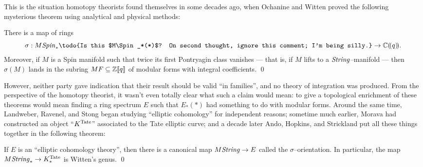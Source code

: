 This is the situation homotopy theorists found themselves in some decades ago, when Ochanine and Witten proved the following mysterious theorem using analytical and physical methods:

\begin{theorem}
There is a map of rings \[\sigma: M\Spin_*\todo{Is this $M\Spin_*(*)$?  On second thought, ignore this comment; I'm being silly.} \to \C(\!(q)\!).\]  Moreover, if $M$ is a Spin manifold such that twice its first Pontryagin class vanishes --- that is, if $M$ lifts to a $\mathit{String}$--manifold --- then $\sigma(M)$ lands in the subring $MF \subseteq \mathbb Z\llbracket{q}\rrbracket$ of modular forms with integral coefficients. \qed
\end{theorem}

\noindent However, neither party gave indication that their result should be valid ``in families'', and no theory of integration was produced.  From the perspective of the homotopy theorist, it wasn't even totally clear what such a claim would mean: to give a topological enrichment of these theorems would mean finding a ring spectrum $E$ such that $E_*(*)$ had something to do with modular forms.  Around the same time, Landweber, Ravenel, and Stong began studying ``elliptic cohomology'' for independent reasons; sometime much earlier, Morava had constructed an object ``$K^{\mathrm{Tate}}$'' associated to the Tate elliptic curve; and a decade later Ando, Hopkins, and Strickland put all these things together in the following theorem:

\begin{theorem}
If $E$ is an ``elliptic cohomology theory'', then there is a canonical map $M\mathit{String} \to E$ called the $\sigma$--orientation.  In particular, the map $M\mathit{String}_* \to K^{\mathrm{Tate}}_*$ is Witten's genus. \qed
\end{theorem}

